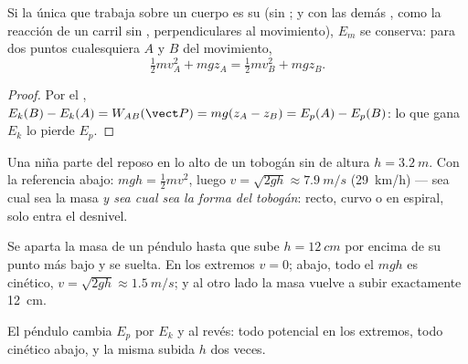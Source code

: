 \begin{theorem}\label{thm:g11:mechanical-energy:conservation}
Si la única  que trabaja sobre un cuerpo es su  (sin
; y con las demás , como la reacción de un carril sin
, perpendiculares al movimiento), $E_m$ se conserva: para dos
puntos cualesquiera $A$ y $B$ del movimiento,
\[
\tfrac12 m v_A^2 + m g z_A = \tfrac12 m v_B^2 + m g z_B .
\]
\end{theorem}

\begin{proof}
Por el ,
$E_k(B) - E_k(A) = W_{AB}(\vect P) = mg(z_A - z_B) = E_p(A) - E_p(B)$:
lo que gana $E_k$ lo pierde $E_p$.
\end{proof}

\begin{example}\label{ex:g11:mechanical-energy:slide}
Una niña parte del reposo en lo alto de un tobogán sin  de
altura $h = \qty{3.2}{m}$. Con la referencia abajo:
$mgh = \tfrac12 mv^2$, luego $v = \sqrt{2gh} \approx \qty{7.9}{m/s}$
(\qty{29}{km/h}) --- sea cual sea la masa \emph{y sea cual sea la forma
del tobogán}: recto, curvo o en espiral, solo entra el desnivel.
\end{example}

\begin{example}[Péndulo]\label{ex:g11:mechanical-energy:pendulum}
Se aparta la masa de un péndulo hasta que sube $h = \qty{12}{cm}$ por
encima de su punto más bajo y se suelta. En los extremos $v = 0$; abajo,
todo el $mgh$ es cinético, $v = \sqrt{2gh} \approx \qty{1.5}{m/s}$; y al
otro lado la masa vuelve a subir exactamente \qty{12}{cm}.
\end{example}

\begin{omfigure}

{\small El péndulo cambia $E_p$ por $E_k$ y al revés: todo potencial en
los extremos, todo cinético abajo, y la misma subida $h$ dos veces.}
\end{omfigure}

